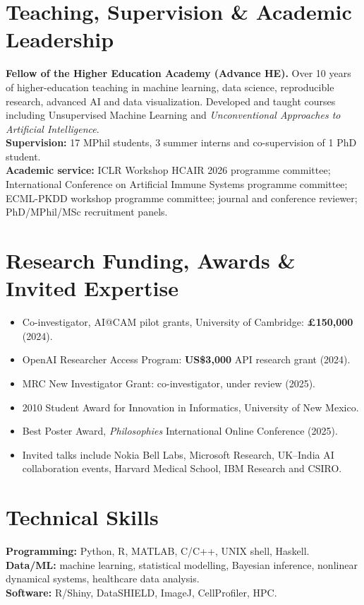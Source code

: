 \documentclass[9pt,a4paper]{article}
\begin{document}
\section*{Teaching, Supervision \& Academic Leadership}
\textbf{Fellow of the Higher Education Academy (Advance HE).} Over 10 years of higher-education teaching in machine learning, data science, reproducible research, advanced AI and data visualization. Developed and taught courses including Unsupervised Machine Learning and \textit{Unconventional Approaches to Artificial Intelligence}.\\
\textbf{Supervision:} 17 MPhil students, 3 summer interns and co-supervision of 1 PhD student.\\
\textbf{Academic service:} ICLR Workshop HCAIR 2026 programme committee; International Conference on Artificial Immune Systems programme committee; ECML-PKDD workshop programme committee; journal and conference reviewer; PhD/MPhil/MSc recruitment panels.

\section*{Research Funding, Awards \& Invited Expertise}
\begin{itemize}
\item Co-investigator, AI@CAM pilot grants, University of Cambridge: \textbf{£150,000} (2024).
\item OpenAI Researcher Access Program: \textbf{US\$3,000} API research grant (2024).
\item MRC New Investigator Grant: co-investigator, under review (2025).
\item 2010 Student Award for Innovation in Informatics, University of New Mexico.
\item Best Poster Award, \textit{Philosophies} International Online Conference (2025).
\item Invited talks include Nokia Bell Labs, Microsoft Research, UK--India AI collaboration events, Harvard Medical School, IBM Research and CSIRO.
\end{itemize}

\section*{Technical Skills}
\textbf{Programming:} Python, R, MATLAB, C/C++, UNIX shell, Haskell. \quad
\textbf{Data/ML:} machine learning, statistical modelling, Bayesian inference, nonlinear dynamical systems, healthcare data analysis.\\
\textbf{Software:} R/Shiny, DataSHIELD, ImageJ, CellProfiler, HPC.
\end{document}
